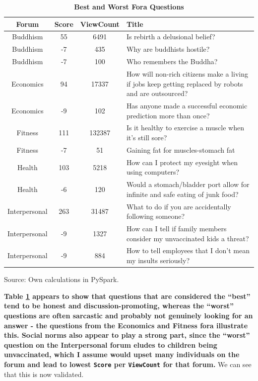 \documentclass[11pt,preprint, authoryear]{article}
\numberwithin{equation}{section}
\begin{document}
\begin{longtable} {@{} cccp{11cm} @{}}
\caption{\textbf{Best and Worst Fora Questions}}
\label{tab:bestworst}\\ 
\toprule
\textbf{Forum} & \textbf{Score} & \textbf{ViewCount} & \textbf{Title} \\ 
\midrule
Buddhism &     55 &       6491 &  Is rebirth a delusional belief? \\
Buddhism &     -7 &        435 &       Why are buddhists hostile? \\
Buddhism &     -7 &        100 &        Who remembers the Buddha? \\
\hline
Economics &     94 &      17337 &  How will non-rich citizens make a living if jobs keep getting replaced by robots and are outsourced? \\
Economics &     -9 &        102 &                                      Has anyone made a successful economic prediction more than once? \\
\hline
Fitness &    111 &     132387 &  Is it healthy to exercise a muscle when it's still sore? \\
Fitness &     -7 &         51 &                       Gaining fat for muscles-stomach fat \\
\hline
Health &    103 &       5218 &                            How can I protect my eyesight when using computers? \\
Health &     -6 &        120 &  Would a stomach/bladder port allow for infinite and safe eating of junk food? \\
\hline
Interpersonal &    263 &      31487 &                     What to do if you are accidentally following someone? \\
Interpersonal &     -9 &       1327 &  How can I tell if family members consider my unvaccinated kids a threat? \\
Interpersonal &     -9 &        884 &             How to tell employees that I don't mean my insults seriously? \\
\bottomrule
\end{longtable}\begin{center} Source: Own calculations in PySpark.\end{center}

\normalsize

\textbf{Table \ref{tab:bestworst} appears to show that questions that
are considered the ``best'' tend to be honest and discussion-promoting,
whereas the ``worst'' questions are often sarcastic and probably not
genuinely looking for an answer - the questions from the Economics and
Fitness fora illustrate this. Social norms also appear to play a strong
part, since the ``worst'' question on the Interpersonal forum eludes to
children being unvaccinated, which I assume would upset many individuals
on the forum and lead to lowest \texttt{Score} per \texttt{ViewCount}
for that forum.} We can see that this is now validated.
\end{document}
